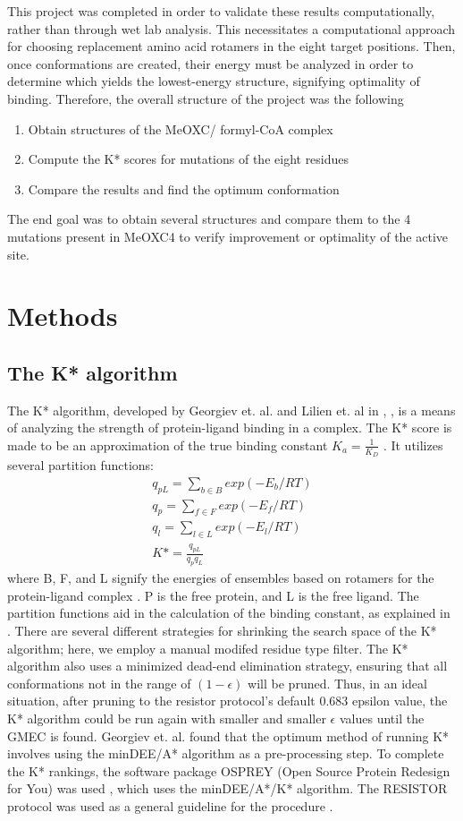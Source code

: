 \documentclass[12pt]{extarticle}
\begin{document}
\indent This project was completed in order to validate these results computationally, rather than through wet lab analysis. This necessitates a computational approach for choosing replacement amino acid rotamers in the eight target positions. Then, once conformations are created, their energy must be analyzed in order to determine which yields the lowest-energy structure, signifying optimality of binding. Therefore, the overall structure of the project was the following \begin{enumerate}
    \item Obtain structures of the MeOXC/ formyl-CoA complex
    \item Compute the K* scores for mutations of the eight residues
    \item Compare the results and find the optimum conformation
\end{enumerate}
The end goal was to obtain several structures and compare them to the 4 mutations present in MeOXC4 to verify improvement or optimality of the active site. 
\section{Methods}
\subsection{The K* algorithm}
The K* algorithm, developed by Georgiev et. al. and Lilien et. al in \cite{Lilien}, \cite{Georgiev}, is a means of analyzing the strength of protein-ligand binding in a complex. The K* score is made to be an approximation of the true binding constant $K_a = \frac{1}{K_D}$ . It utilizes several partition functions:\begin{align}
    q_{pL} = \sum_{b \in B}exp(-E_b/RT)\\
    q_{p} = \sum_{f \in F}exp(-E_f/RT)\\
    q_{l} = \sum_{l \in L}exp(-E_l/RT)\\
    K* = \frac{q_{pL}}{q_p q_L}
\end{align} where B, F, and L signify the energies of ensembles based on rotamers for the protein-ligand complex \cite{Donald}. P is the free protein, and L is the free ligand. The partition functions aid in the calculation of the binding constant, as explained in \cite{Donald}. There are several different strategies for shrinking the search space of the K* algorithm; here, we employ a manual modifed residue type filter. The K* algorithm also uses a minimized dead-end elimination strategy, ensuring that all conformations not in the range of $(1-\epsilon)$ will be pruned. Thus, in an ideal situation, after pruning to the resistor protocol's default 0.683 epsilon value, the K* algorithm could be run again with smaller and smaller $\epsilon$ values until the GMEC is found. Georgiev et. al. found that the optimum method of running K* involves using the minDEE/A* algorithm as a pre-processing step. 
To complete the K* rankings, the software package OSPREY (Open Source Protein Redesign for You) was used \cite{Hallen}, which uses the minDEE/A*/K* algorithm. The RESISTOR protocol was used as a general guideline for the procedure \cite{RESISTOR}. 
\end{document}
